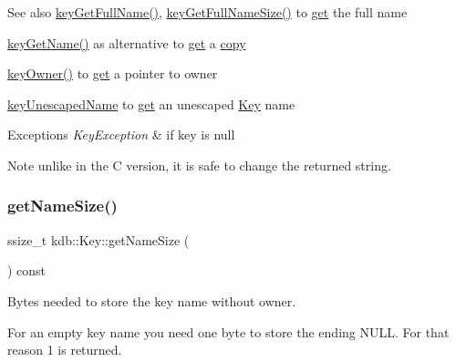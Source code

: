 \begin{DoxyItemize}
\begin{DoxySeeAlso}{See also}
\mbox{\hyperlink{group__keyname_gaaba1494a5ffc976e0e56c43f4334a23c}{key\+Get\+Full\+Name()}}, \mbox{\hyperlink{group__keyname_gab65dc9d43d3ee08d5e936a20ebbddd23}{key\+Get\+Full\+Name\+Size()}} to \mbox{\hyperlink{classkdb_1_1Key_ac558a1f1b2cb50d77fbabcbb24950c05}{get}} the full name 

\mbox{\hyperlink{group__keyname_gab29a850168d9b31c9529e90cf9ab68be}{key\+Get\+Name()}} as alternative to \mbox{\hyperlink{classkdb_1_1Key_ac558a1f1b2cb50d77fbabcbb24950c05}{get}} a \mbox{\hyperlink{classkdb_1_1Key_ab5bc93e22f4cf40b9d2b1fc32cc260be}{copy}} 

\mbox{\hyperlink{owner_8c_af6485fb8599714b6bbd830cf915ffea5}{key\+Owner()}} to \mbox{\hyperlink{classkdb_1_1Key_ac558a1f1b2cb50d77fbabcbb24950c05}{get}} a pointer to owner 

\mbox{\hyperlink{group__keyname_ga6fe6af4c27b35d911a533f4ae4d698bb}{key\+Unescaped\+Name}} to \mbox{\hyperlink{classkdb_1_1Key_ac558a1f1b2cb50d77fbabcbb24950c05}{get}} an unescaped \mbox{\hyperlink{group__key}{Key}} name
\end{DoxySeeAlso}

\begin{DoxyExceptions}{Exceptions}
{\em Key\+Exception} & if key is null\\
\hline
\end{DoxyExceptions}
\begin{DoxyNote}{Note}
unlike in the C version, it is safe to change the returned string. 
\end{DoxyNote}

\end{DoxyItemize}\mbox{\label{classkdb_1_1Key_a976627183cdc6835a969475e99ec8bc1}} 
\subsubsection{\texorpdfstring{getNameSize()}{getNameSize()}}
{\footnotesize\ttfamily ssize\+\_\+t kdb\+::\+Key\+::get\+Name\+Size (\begin{DoxyParamCaption}{ }\end{DoxyParamCaption}) const\hspace{0.3cm}{\ttfamily [inline]}}



Bytes needed to store the key name without owner. 

For an empty key name you need one byte to store the ending N\+U\+LL. For that reason 1 is returned.


